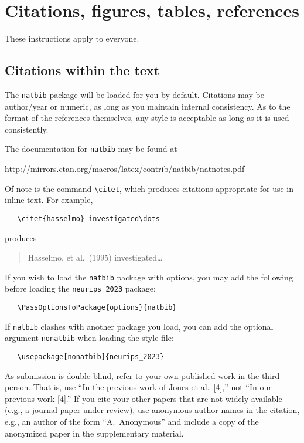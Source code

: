 \documentclass{article}
\begin{document}
\section{Citations, figures, tables, references}
\label{others}


These instructions apply to everyone.


\subsection{Citations within the text}


The \verb+natbib+ package will be loaded for you by default.  Citations may be
author/year or numeric, as long as you maintain internal consistency.  As to the
format of the references themselves, any style is acceptable as long as it is
used consistently.


The documentation for \verb+natbib+ may be found at
\begin{center}
  \url{http://mirrors.ctan.org/macros/latex/contrib/natbib/natnotes.pdf}
\end{center}
Of note is the command \verb+\citet+, which produces citations appropriate for
use in inline text.  For example,
\begin{verbatim}
   \citet{hasselmo} investigated\dots
\end{verbatim}
produces
\begin{quote}
  Hasselmo, et al.\ (1995) investigated\dots
\end{quote}


If you wish to load the \verb+natbib+ package with options, you may add the
following before loading the \verb+neurips_2023+ package:
\begin{verbatim}
   \PassOptionsToPackage{options}{natbib}
\end{verbatim}


If \verb+natbib+ clashes with another package you load, you can add the optional
argument \verb+nonatbib+ when loading the style file:
\begin{verbatim}
   \usepackage[nonatbib]{neurips_2023}
\end{verbatim}


As submission is double blind, refer to your own published work in the third
person. That is, use ``In the previous work of Jones et al.\ [4],'' not ``In our
previous work [4].'' If you cite your other papers that are not widely available
(e.g., a journal paper under review), use anonymous author names in the
citation, e.g., an author of the form ``A.\ Anonymous'' and include a copy of the anonymized paper in the supplementary material.
\end{document}
